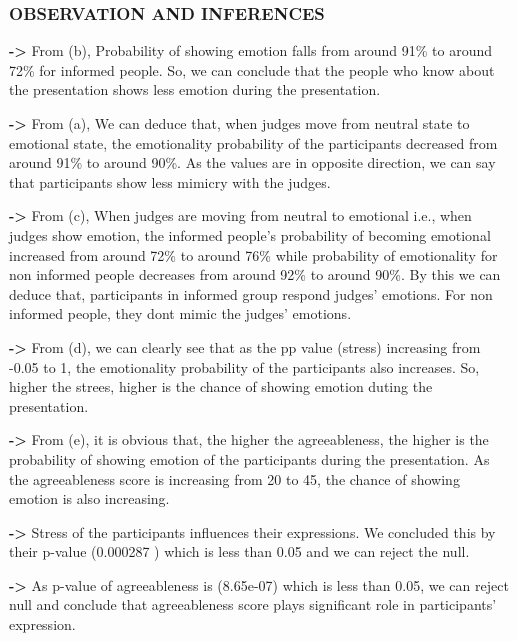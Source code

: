 \documentclass[
]{article}
\begin{document}
\hypertarget{observation-and-inferences}{%
\subsubsection{OBSERVATION AND
INFERENCES}\label{observation-and-inferences}}

\textbf{-\textgreater{}} From (b), Probability of showing emotion falls
from around 91\% to around 72\% for informed people. So, we can conclude
that the people who know about the presentation shows less emotion
during the presentation.

\textbf{-\textgreater{}} From (a), We can deduce that, when judges move
from neutral state to emotional state, the emotionality probability of
the participants decreased from around 91\% to around 90\%. As the
values are in opposite direction, we can say that participants show less
mimicry with the judges.

\textbf{-\textgreater{}} From (c), When judges are moving from neutral
to emotional i.e., when judges show emotion, the informed people's
probability of becoming emotional increased from around 72\% to around
76\% while probability of emotionality for non informed people decreases
from around 92\% to around 90\%. By this we can deduce that,
participants in informed group respond judges' emotions. For non
informed people, they dont mimic the judges' emotions.

\textbf{-\textgreater{}} From (d), we can clearly see that as the pp
value (stress) increasing from -0.05 to 1, the emotionality probability
of the participants also increases. So, higher the strees, higher is the
chance of showing emotion duting the presentation.

\textbf{-\textgreater{}} From (e), it is obvious that, the higher the
agreeableness, the higher is the probability of showing emotion of the
participants during the presentation. As the agreeableness score is
increasing from 20 to 45, the chance of showing emotion is also
increasing.

\textbf{-\textgreater{}} Stress of the participants influences their
expressions. We concluded this by their p-value (0.000287 ) which is
less than 0.05 and we can reject the null.

\textbf{-\textgreater{}} As p-value of agreeableness is (8.65e-07) which
is less than 0.05, we can reject null and conclude that agreeableness
score plays significant role in participants' expression.
\end{document}

